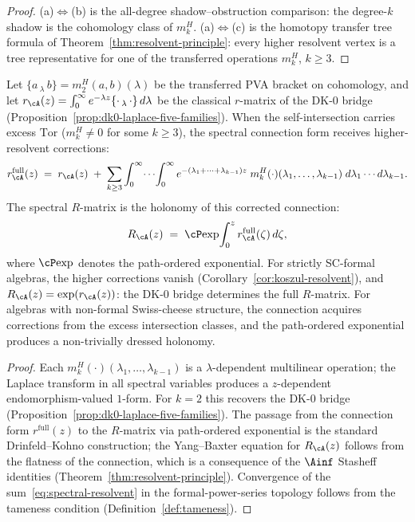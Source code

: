 \begin{proof}
(a)$\Leftrightarrow$(b) is the all-degree shadow--obstruction
comparison: the degree-$k$ shadow is the cohomology class of
$m_k^H$.
(a)$\Leftrightarrow$(c) is the homotopy transfer tree formula of
Theorem~\ref{thm:resolvent-principle}: every higher resolvent vertex
is a tree representative for one of the transferred operations
$m_k^H$, $k\geq3$.
\end{proof}

\begin{proposition}
\label{prop:spectral-resolvent}
Let $\{a \,{}_\lambda\, b\} = m_2^H(a,b)(\lambda)$ be the
transferred PVA bracket on cohomology, and let
$r_\cA(z) = \int_0^\infty e^{-\lambda z}
\{{\cdot}\,{}_\lambda\,{\cdot}\}\,d\lambda$
be the classical $r$-matrix of the DK-0 bridge
\textup{(}Proposition~\textup{\ref{prop:dk0-laplace-five-families}}\textup{)}.
When the self-intersection carries excess\/ $\mathrm{Tor}$
\textup{(}$m_k^H \neq 0$ for some\/ $k \geq 3$\textup{)},
the spectral connection form receives higher-resolvent
corrections:
\begin{equation}
\label{eq:spectral-resolvent}
 r_\cA^{\mathrm{full}}(z)
 \;=\;
 r_\cA(z)
 \;+\;
 \sum_{k \geq 3}
 \int_0^\infty \!\cdots\! \int_0^\infty
 e^{-(\lambda_1 + \cdots + \lambda_{k-1})z}\;
 m_k^H(\cdot)(\lambda_1, \ldots, \lambda_{k-1})\;
 d\lambda_1 \cdots d\lambda_{k-1}.
\end{equation}
The spectral $R$-matrix is the holonomy of this corrected
connection:
\begin{equation}
\label{eq:R-as-holonomy}
 R_\cA(z) \;=\; \cP\!\exp\!\int_0^z
 r_\cA^{\mathrm{full}}(\zeta)\,d\zeta,
\end{equation}
where $\cP\!\exp$ denotes the path-ordered exponential.
For strictly SC-formal algebras, the higher corrections vanish
\textup{(}Corollary~\textup{\ref{cor:koszul-resolvent}}\textup{)},
and $R_\cA(z) = \exp(r_\cA(z))$: the DK-0 bridge determines
the full $R$-matrix. For algebras with non-formal Swiss-cheese structure, the connection
acquires corrections from the excess intersection classes,
and the path-ordered exponential produces a non-trivially
dressed holonomy.
\end{proposition}

\begin{proof}
Each $m_k^H(\cdot)(\lambda_1, \ldots, \lambda_{k-1})$ is a
$\lambda$-dependent multilinear operation; the Laplace transform in
all spectral variables produces a $z$-dependent endomorphism-valued
$1$-form. For $k = 2$ this recovers the DK-0 bridge
(Proposition~\ref{prop:dk0-laplace-five-families}).
The passage from the connection form $r^{\mathrm{full}}(z)$ to the
$R$-matrix via path-ordered exponential is the standard
Drinfeld--Kohno construction; the Yang--Baxter equation for
$R_\cA(z)$ follows from the flatness of the connection, which is
a consequence of the $\Ainf$ Stasheff identities
(Theorem~\ref{thm:resolvent-principle}).
Convergence of the sum~\eqref{eq:spectral-resolvent}
in the formal-power-series topology follows from the tameness
condition (Definition~\ref{def:tameness}).
\end{proof}

